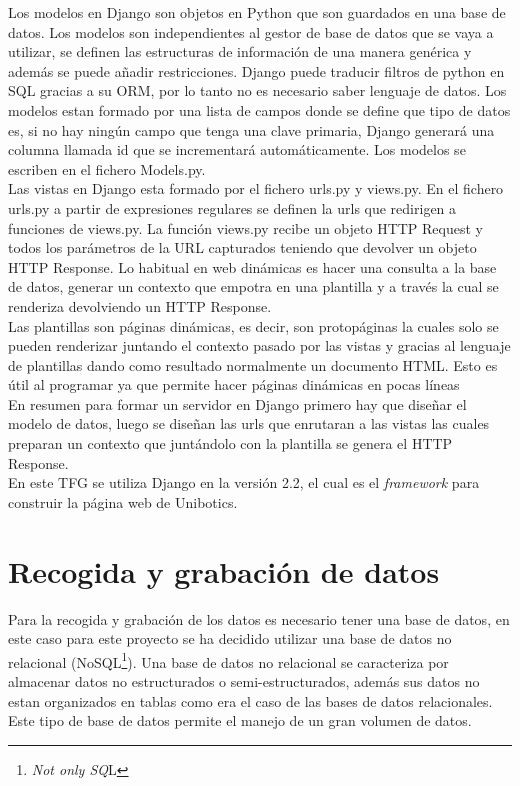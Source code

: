 Los modelos en Django son objetos en Python que son guardados en una base de datos. Los modelos son independientes al gestor de base de datos que se vaya a utilizar, se definen las estructuras de información de una manera genérica y además se puede añadir restricciones. Django puede traducir filtros de python en SQL gracias a su ORM, por lo tanto no es necesario saber lenguaje de datos. Los modelos estan formado por una lista de campos donde se define que tipo de datos es, si no hay ningún campo que tenga una clave primaria, Django generará una columna llamada id que se incrementará automáticamente. Los modelos se escriben en el fichero Models.py.\cite{model}\\

Las vistas en Django esta formado por el fichero urls.py y views.py. En el fichero urls.py a partir de expresiones regulares se definen la urls que redirigen a funciones de views.py. La función views.py recibe un objeto HTTP Request y todos los parámetros de la URL capturados teniendo que devolver un objeto HTTP Response. Lo habitual en web dinámicas es hacer una consulta a la base de datos, generar un contexto que empotra en una plantilla y a través la cual se renderiza devolviendo un HTTP Response.\\

Las plantillas son páginas dinámicas, es decir, son protopáginas la cuales solo se pueden renderizar juntando el contexto pasado por las vistas y gracias al lenguaje de plantillas dando como resultado normalmente un documento HTML. Esto es útil al programar ya que permite hacer páginas dinámicas en pocas líneas\\
\newpage
En resumen para formar un servidor en Django primero hay que diseñar el modelo de datos, luego se diseñan las urls que enrutaran a las vistas las cuales preparan un contexto que juntándolo con la plantilla se genera el HTTP Response.\\

En este TFG se utiliza Django en la versión 2.2, el cual es el\textit{ framework} para construir la página web de Unibotics.

\section{Recogida y grabación de datos}
Para la recogida y grabación de los datos es necesario tener una base de datos, en este caso para este proyecto se ha decidido utilizar una base de datos no relacional (NoSQL\footnote{\textit{Not only SQ}L}). Una base de datos no relacional se caracteriza por almacenar datos no estructurados o semi-estructurados, además sus datos no estan organizados en tablas como era el caso de las bases de datos relacionales. Este tipo de base de datos permite el manejo de un gran volumen de datos.\\

